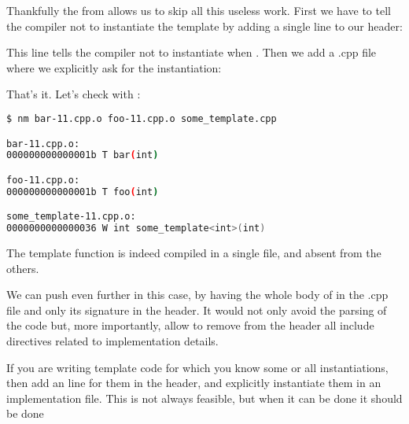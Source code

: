 \bigskip

Thankfully the  from  allows us to skip
all this useless work. First we have to tell the compiler not to
instantiate the template by adding a single line to our header:



This line tells the compiler not to instantiate
 when . Then we add a .cpp file
where we explicitly ask for the instantiation:



That's it. Let's check with :

\begin{lstlisting}[language=bash]
$ nm bar-11.cpp.o foo-11.cpp.o some_template.cpp

bar-11.cpp.o:
000000000000001b T bar(int)

foo-11.cpp.o:
000000000000001b T foo(int)

some_template-11.cpp.o:
0000000000000036 W int some_template<int>(int)
\end{lstlisting}

The template function is indeed compiled in a single file, and absent
from the others.

We can push even further in this case, by having the whole body of
 in the .cpp file and only its signature in the
header. It would not only avoid the parsing of the code but, more
importantly, allow to remove from the header all include directives
related to implementation details.

\begin{guideline}
If you are writing template code for which you know some or all
instantiations, then add an  line for them in
the header, and explicitly instantiate them in an implementation file.
This is not always feasible, but when it can be done it should be done
\end{guideline}
